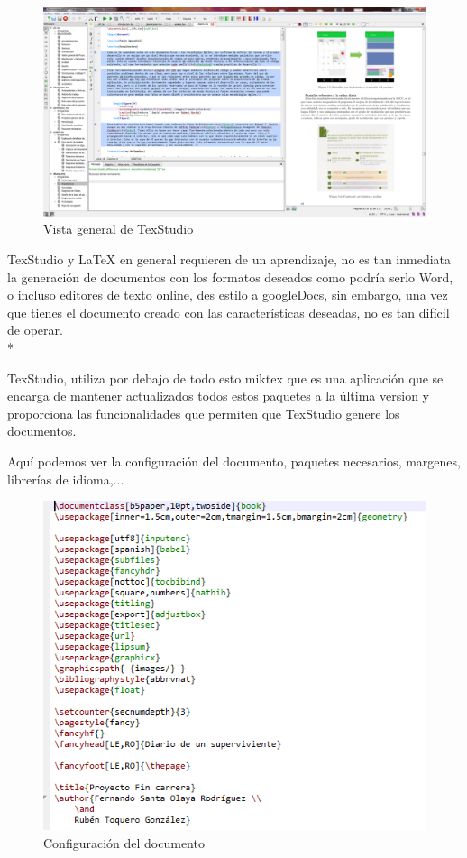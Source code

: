 \documentclass[../pfc.tex]{subfiles}
\begin{document}
	\begin{figure}[H]
		\centering
		\includegraphics[width=1\linewidth]{../images/texstructura}
		\caption{Vista general de TexStudio}
		\label{fig:texstudio}
	\end{figure}
	
	TexStudio y LaTeX en general requieren de un aprendizaje, no es tan inmediata la generación de documentos con los formatos deseados como podría serlo Word, o incluso editores de texto online, des estilo a googleDocs, sin embargo, una vez que tienes el documento creado con las características deseadas, no es tan difícil de operar.\\*
	
	\clearpage

	TexStudio, utiliza por debajo de todo esto miktex que es una aplicación que se encarga de mantener actualizados todos estos paquetes a la última version y proporciona las funcionalidades que permiten que TexStudio genere los documentos.
	
	Aquí podemos ver la configuración del documento, paquetes necesarios, margenes, librerías de idioma,...
	


	\begin{figure}[H]
		\centering
		\includegraphics[width=0.7\linewidth]{../images/texstudiopack}
		\caption{Configuración del documento}
		\label{fig:texstudioPaQ}
	\end{figure}
	
\end{document}
